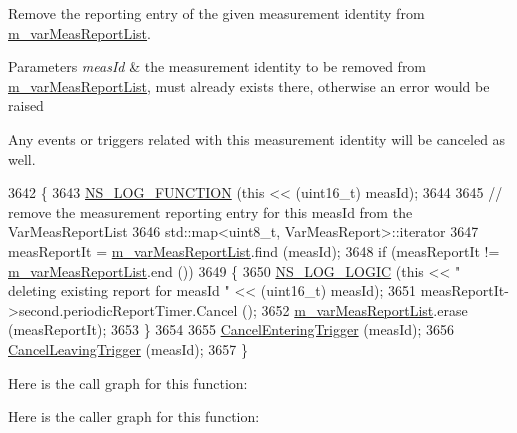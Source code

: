 Remove the reporting entry of the given measurement identity from \hyperlink{classns3_1_1LteUeRrc_a82da3c138c967761910c02b83724a0e4}{m\+\_\+var\+Meas\+Report\+List}. 


\begin{DoxyParams}{Parameters}
{\em meas\+Id} & the measurement identity to be removed from \hyperlink{classns3_1_1LteUeRrc_a82da3c138c967761910c02b83724a0e4}{m\+\_\+var\+Meas\+Report\+List}, must already exists there, otherwise an error would be raised\\
\hline
\end{DoxyParams}
Any events or triggers related with this measurement identity will be canceled as well. 
\begin{DoxyCode}
3642 \{
3643   \hyperlink{log-macros-disabled_8h_a90b90d5bad1f39cb1b64923ea94c0761}{NS\_LOG\_FUNCTION} (\textcolor{keyword}{this} << (uint16\_t) measId);
3644 
3645   \textcolor{comment}{// remove the measurement reporting entry for this measId from the VarMeasReportList}
3646   std::map<uint8\_t, VarMeasReport>::iterator
3647     measReportIt = \hyperlink{classns3_1_1LteUeRrc_a82da3c138c967761910c02b83724a0e4}{m\_varMeasReportList}.find (measId);
3648   \textcolor{keywordflow}{if} (measReportIt != \hyperlink{classns3_1_1LteUeRrc_a82da3c138c967761910c02b83724a0e4}{m\_varMeasReportList}.end ())
3649     \{
3650       \hyperlink{group__logging_ga88acd260151caf2db9c0fc84997f45ce}{NS\_LOG\_LOGIC} (\textcolor{keyword}{this} << \textcolor{stringliteral}{" deleting existing report for measId "} << (uint16\_t) measId);
3651       measReportIt->second.periodicReportTimer.Cancel ();
3652       \hyperlink{classns3_1_1LteUeRrc_a82da3c138c967761910c02b83724a0e4}{m\_varMeasReportList}.erase (measReportIt);
3653     \}
3654 
3655   \hyperlink{classns3_1_1LteUeRrc_a9221d85411de5dd375b71b44e3331c5c}{CancelEnteringTrigger} (measId);
3656   \hyperlink{classns3_1_1LteUeRrc_a3e35c475cfb5361222f1556bfbd3111d}{CancelLeavingTrigger} (measId);
3657 \}
\end{DoxyCode}


Here is the call graph for this function\+:




Here is the caller graph for this function\+:


